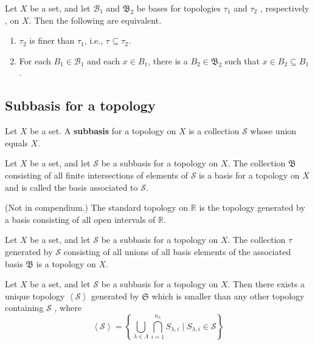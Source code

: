 \documentclass{article}
\theoremstyle{remark}
\begin{document}
\begin{theorem}
Let $X$ be a set, and let  $ \mathscr{B} _{1} $ and $\mathfrak{B} _{2}$ be bases for topologies $\tau _{1}$ and $\tau
_{2}$ , respectively , on $X$. Then the following are equivalent.
\begin{enumerate}[label=(\roman*)]
    \item $\tau _{2}$ is finer than $\tau _{1}$, i.e., $\tau _{} \subseteq  \tau _{2}$.
    \item For each $B_{1} \in \mathscr{B} _{1}$ and each $x \in B_{1}$, there is a $B_{2} \in \mathfrak{B} _{2}$ such
        that $x \in  B_{2} \subseteq B_{1}$.
\end{enumerate}
\end{theorem}

\subsection{Subbasis for a topology}%
\label{sub:subbasis_for_a_topology}

\begin{definition}[Subbasis]

    Let $X$ be a set. A \textbf{subbasis } for a topology on $X$ is a collection $ \mathscr{S} $ whose union equals $X$.
\end{definition}

\begin{lemma}
Let $X$ be a set, and let $ \mathscr{S} $ be a subbasis for a topology on $X$. The collection $ \mathfrak{B} $
consisting of all finite intersections of elements of $\mathscr{S} $ is a basis for a topology on $X$ and is called the
basis associated to $ \mathscr{S} $.
\end{lemma}


\begin{definition}
    (Not in compendium.)
    The standard topology on $ \mathbb{R} $ is the topology generated by a basis consisting of all open intervals of $
    \mathbb{R} $.
\end{definition}

\begin{lemma}
Let $X$ be a set, and let $\mathscr{S} $ be a subbasis for a topology on $X$. The collection $\tau $ generated by $
\mathscr{S} $ consisting of all unions of all basis elements of the associated basis $\mathfrak{B} $ is a topology on
$X$.
\end{lemma}

\begin{theorem}
    Let $X$ be a set, and let $ \mathscr{S} $ be a subbasis for a topology on $X$. Then there exists a unique topology
    $\left<\mathscr{S}  \right>$ generated by $ \mathfrak{S} $ which is smaller than any other topology containing
    $\mathscr{S} $ , where \[
    \left<\mathscr{S}  \right> = \left\{ \bigcup_{\lambda  \in  \Lambda }^{} \bigcap_{i=1}^{n_{\lambda }} S_{\lambda
    ,i}  \mid  S_{\lambda ,i} \in  \mathscr{S}     \right\}
    \]
\end{theorem}
\end{document}
